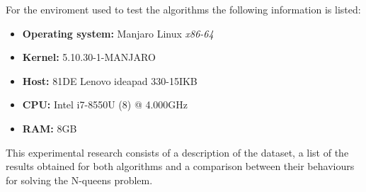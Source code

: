 \documentclass[]{llncs}
\begin{document}
For the enviroment used to test the algorithms the following information is listed:
\begin{itemize}
    \item \textbf{Operating system:} Manjaro Linux \textit{x86-64}
    \item \textbf{Kernel:} 5.10.30-1-MANJARO
    \item \textbf{Host:} 81DE Lenovo ideapad 330-15IKB
    \item \textbf{CPU:} Intel i7-8550U (8) @ 4.000GHz
    \item \textbf{RAM:} 8GB
\end{itemize}

This experimental research consists of a description of the dataset, a list of the results obtained for both algorithms and a comparison between their behaviours for solving the N-queens problem.
\end{document}
